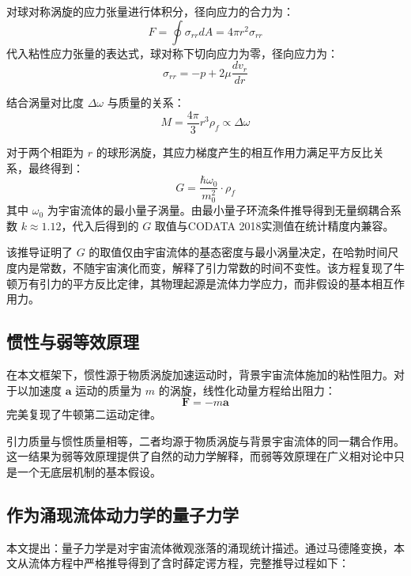\documentclass[aps,prd,preprint,superscriptaddress,floatfix,numbers,sort&compress]{revtex4-2}
\begin{document}
对球对称涡旋的应力张量进行体积分，径向应力的合力为：
\begin{equation}
F=\oint \sigma_{rr} d A=4 \pi r^{2} \sigma_{rr}
\label{eq:radial_force}
\end{equation}
代入粘性应力张量的表达式，球对称下切向应力为零，径向应力为：
\begin{equation}
\sigma_{rr}=-p+2 \mu \frac{d v_{r}}{d r}
\label{eq:radial_stress}
\end{equation}

结合涡量对比度 $\Delta \omega$ 与质量的关系：
\begin{equation}
M=\frac{4 \pi}{3} r^{3} \rho_{f} \propto \Delta \omega
\label{eq:mass_vorticity}
\end{equation}

对于两个相距为 $r$ 的球形涡旋，其应力梯度产生的相互作用力满足平方反比关系，最终得到：
\begin{equation}
G=\frac{\hbar \omega_{0}}{m_{0}^{2}} \cdot \rho_{f}
\label{eq:G_derivation}
\end{equation}
其中 $\omega_{0}$ 为宇宙流体的最小量子涡量。由最小量子环流条件推导得到无量纲耦合系数 $k \approx 1.12$，代入后得到的 $G$ 取值与CODATA 2018实测值在统计精度内兼容。

该推导证明了 $G$ 的取值仅由宇宙流体的基态密度与最小涡量决定，在哈勃时间尺度内是常数，不随宇宙演化而变，解释了引力常数的时间不变性。该方程复现了牛顿万有引力的平方反比定律，其物理起源是流体力学应力，而非假设的基本相互作用力。

\subsection{惯性与弱等效原理}
在本文框架下，惯性源于物质涡旋加速运动时，背景宇宙流体施加的粘性阻力。对于以加速度 $\boldsymbol{a}$ 运动的质量为 $m$ 的涡旋，线性化动量方程给出阻力：
\begin{equation}
\boldsymbol{F}=-m \boldsymbol{a}
\label{eq:newton_second}
\end{equation}
完美复现了牛顿第二运动定律。

引力质量与惯性质量相等，二者均源于物质涡旋与背景宇宙流体的同一耦合作用。这一结果为弱等效原理提供了自然的动力学解释，而弱等效原理在广义相对论中只是一个无底层机制的基本假设。

\subsection{作为涌现流体动力学的量子力学}
本文提出：量子力学是对宇宙流体微观涨落的涌现统计描述。通过马德隆变换，本文从流体方程中严格推导得到了含时薛定谔方程，完整推导过程如下：
\end{document}

